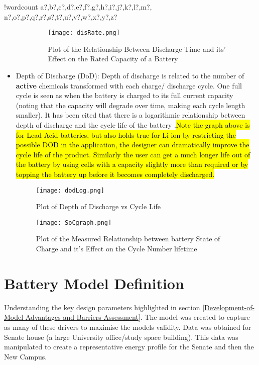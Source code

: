 \documentclass[fontsize=9.5pt]{extarticle}
\numberwithin{figure}{section} %
\newcounter{words}
\newenvironment{counted}{%
  \setcounter{words}{0}
  \SearchList!{wordcount}{\stepcounter{words}}
    {a?,b?,c?,d?,e?,f?,g?,h?,i?,j?,k?,l?,m?,
    n?,o?,p?,q?,r?,s?,t?,u?,v?,w?,x?,y?,z?}
  \UndoBoundary{'}
  \SearchOrder{p;}}{%
  \StopSearching}
\begin{document}
\begin{counted}
\begin{itemize}
\begin{itemize}
    \begin{figure}[H]
       \centering
       \texttt{[image: disRate.png]}
       \caption{Plot of the Relationship Between Discharge Time and its' Effect on the Rated Capacity of a Battery \cite{Effectso69:online}}
       \label{disRate}
     \end{figure}
  \end{itemize}
\item
  Depth of Discharge (DoD): Depth of discharge is related to the number
  of \textbf{active} chemicals transformed with each charge/ discharge
  cycle. One full cycle is seen as when the battery is charged to its
  full current capacity (noting that the capacity will degrade over
  time, making each cycle length smaller). It has been cited that there
  is a logarithmic relationship between depth of discharge and the cycle
  life of the battery
  \cite{BatteryL10:online}.\hl{Note the graph above is for Lead-Acid batteries, but also holds true for Li-ion by restricting the possible DOD in the application, the designer can dramatically improve the cycle life of the product. Similarly the user can get a much longer life out of the battery by using cells with a capacity slightly more than required or by topping the battery up before it becomes completely discharged.}
  \cite{BatteryL10:online}

  \begin{figure}[H]
    \centering
    \texttt{[image: dodLog.png]}
    \caption{Plot of Depth of Discharge vs Cycle Life \cite{BatteryL10:online}}
    \label{dodLog}
  \end{figure}

  \begin{figure}[H]
  \centering
  \texttt{[image: SoCgraph.png]}
  \caption{Plot of the Measured  Relationship between battery State of Charge and it's Effect on the Cycle Number lifetime \cite{xu2016modeling}}
  \label{SoCgraph}
    \end{figure}
\end{itemize}

\newpage

\section{Battery Model Definition}\label{battery-model-definition}

Understanding the key design parameters highlighted in section
\ref{Development-of-Model-Advantages-and-Barriers-Assessment}. The model
was created to capture as many of these drivers to maximise the models
validity. Data was obtained for Senate house (a large University
office/study space building). This data was manipulated to create a
representative energy profile for the Senate and then the New Campus.


\end{counted}
\end{document}
